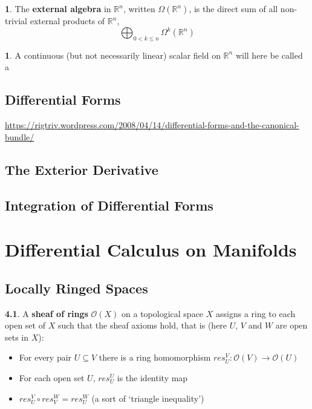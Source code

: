 \documentclass[oneside,english]{amsbook}
\numberwithin{section}{chapter}
\theoremstyle{plain}
\theoremstyle{definition}
\newtheorem{defn}[thm]{\protect\definitionname}
\providecommand{\definitionname}{Definition}
\begin{document}
			\begin{defn}
				The \textbf{external algebra} in $\mathbb{R}^n$, written $\Omega(\mathbb{R}^n)$, is the direct sum of all non-trivial external products of $\mathbb{R}^n$,
				\[
					\bigoplus_{0<k\le n}\Omega^k(\mathbb{R}^n)
				\]
			\end{defn}
			
			\begin{defn}
				A continuous (but not necessarily linear) scalar field on $\mathbb{R}^n$ will here be called a 
			\end{defn}

		\section{Differential Forms}
		
		\url{https://rigtriv.wordpress.com/2008/04/14/differential-forms-and-the-canonical-bundle/}
	
		\section{The Exterior Derivative}
	
		\section{Integration of Differential Forms}

	\chapter{Differential Calculus on Manifolds}
	
		\section{Locally Ringed Spaces}

			\begin{defn} 
				A \textbf{sheaf of rings} $\mathscr{O}(X)$ on a topological space $X$ assigns a ring to each open set of $X$ such that the sheaf axioms hold, that is (here $U$, $V$ and $W$ are open sets in $X$):
				\begin{itemize}
					\item For every pair $U\subseteq V$ there is a ring homomorphism $res_U^V: \mathscr{O}(V)\to \mathscr{O}(U)$
					\item For each open set $U$, $res_U^U$ is the identity map
					\item $res_U^V \circ res_V^W = res_U^W$ (a sort of `triangle inequality')
				\end{itemize}
			\end{defn}
			
\end{document}
